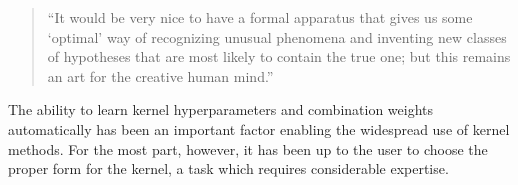 \documentclass[twoside]{article}
\begin{document}
{\begin{quotation}
``It would be very nice to have a formal apparatus that gives us some ‘optimal’ way of recognizing unusual phenomena and inventing new classes of hypotheses that are most likely to contain the true one; but this remains an art for the creative human mind.''

\hspace*{\fill}\citet{Jaynes85highlyinformative}


\end{quotation}


%


The ability to learn kernel hyperparameters and combination weights automatically has been an important factor enabling the widespread use of kernel methods.
For the most part, however, it has been up to the user to choose the proper form for the kernel, a task which requires considerable expertise.

}
\end{document}
